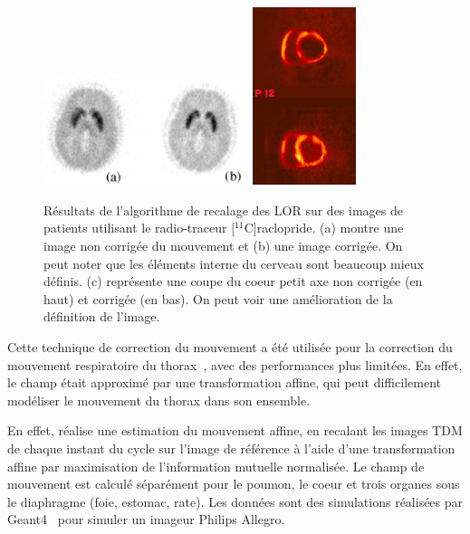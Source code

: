 \begin{figure}[h!]
	\begin{center}
		\includegraphics[width=6cm]{images/bloomfield2003design} \includegraphics[width=3cm]{images/livieratos2005rigid}
	\end{center}
	\caption{Résultats de l'algorithme de recalage des LOR sur des images de patients utilisant le radio-traceur [$^{11}$C]raclopride. (a) montre une image non corrigée du mouvement et (b) une image corrigée. On peut noter que les éléments interne du cerveau sont beaucoup mieux définis. (c) représente une coupe du coeur petit axe non corrigée (en haut) et corrigée (en bas). On peut voir une amélioration de la définition de l'image.} 
	\label{fig:ameliorationLOR}
\end{figure}
 
Cette technique de correction du mouvement a été utilisée pour la correction du mouvement respiratoire du thorax~\cite{lamare2007respiratory,lamare2007list}, avec des performances plus limitées. En effet, le champ était approximé par une transformation affine, qui peut difficilement modéliser le mouvement du thorax dans son ensemble.

En effet, \cite{lamare2007respiratory} réalise une estimation du mouvement affine, en recalant les images TDM de chaque instant du cycle sur l'image de référence à l'aide d'une transformation affine par maximisation de l'information mutuelle normalisée. Le champ de mouvement  est calculé séparément pour le poumon, le coeur et trois organes sous le diaphragme (foie, estomac, rate). Les données sont des simulations réalisées par Geant4~\cite{jan2004gate} pour simuler un imageur Philips Allegro.

